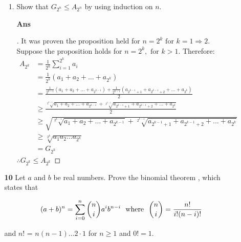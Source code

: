 \documentclass[paper=usletter, fontsize=12pt]{article}
\begin{document}
\begin{itemize}
\begin{itemize}
\begin{enumerate}
                \item Show that $G_{2^n} \le A_{2^n}$ by using induction on
                $n$.
                \item[\textbf{Ans}]
                \begin{proof}[\unskip\nopunct]
                    It was proven the proposition held for $n = 2^k \text{ for
                    \ } k = 1 \Rightarrow 2$. \\
                    Suppose the proposition holds for $n = 2^k, \text{ for \ }
                    k > 1$. Therefore:
                    \begin{align*}
                        A_{2^k} & = \frac{1}{2^k}\sum_{i=1}^{2^k}a_i \\
                        & = \frac{1}{2^k}(a_1 + a_2 + \ldots + a_{2^k}) \\
                        & = \frac{\frac{1}{2^{k-1}}(a_1 + a_2 + \ldots +
                        a_{2^{k-1}}) + \frac{1}{2^{k-1}}(a_{2^{k-1}+1} +
                        a_{2^{k-1}+2} + \ldots + a_{2^k})}{2} \\
                        & \ge \frac{\sqrt[2^{k-1}]{a_1 + a_2 + \ldots +
                        a_{2^{k-1}}} + \sqrt[2^{k-1}]{a_{2^{k-1}+1} +
                        a_{2^{k-1}+2} + \ldots + a_{2^k}}}{2} \\
                        & \ge \sqrt{\sqrt[2^{k-1}]{a_1 + a_2 + \ldots +
                        a_{2^{k-1}}} + \sqrt[2^{k-1}]{a_{2^{k-1}+1} +
                        a_{2^{k-1}+2} + \ldots + a_{2^k}}} \\
                        & \ge \sqrt[2^k]{a_{1}a_{2}\ldots a_{2^k}} \\
                        & = G_{2^k}
                    \end{align*}
                    $\therefore G_{2^k} \le A_{2^k}$ \qedhere
                \end{proof}
                \vspace{0.2in}

            \end{enumerate}

            \item[\textbf{10}] Let $a$ and $b$ be real numbers. Prove the
            binomial theorem , which states that

                \[ (a+b)^n = \sum_{i=0}^{n} \binom{n}{i}a^{i}b^{n-i} \text{\ \
                where \ } \binom{n}{i}=\frac{n!}{i!(n-i)!} \]

            and $n!$ = $n(n-1)\ldots 2 \cdot 1$ for $n \ge 1$ and $0! = 1$.


\end{itemize}
\end{itemize}
\end{document}
